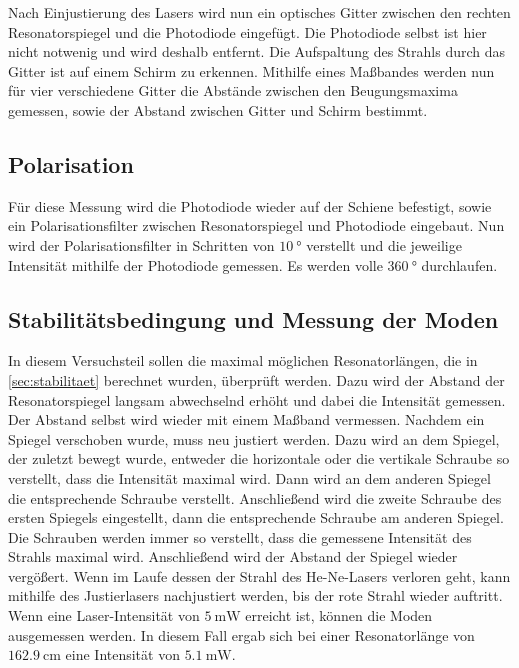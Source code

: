     Nach Einjustierung des Lasers wird nun ein optisches Gitter zwischen den rechten Resonatorspiegel und die Photodiode eingefügt.
    Die Photodiode selbst ist hier nicht notwenig und wird deshalb entfernt.
    Die Aufspaltung des Strahls durch das Gitter ist auf einem Schirm zu erkennen.
    Mithilfe eines Maßbandes werden nun für vier verschiedene Gitter die Abstände zwischen den Beugungsmaxima gemessen,
    sowie der Abstand zwischen Gitter und Schirm bestimmt.

\subsection{Polarisation}

    Für diese Messung wird die Photodiode wieder auf der Schiene befestigt,
    sowie ein Polarisationsfilter zwischen Resonatorspiegel und Photodiode eingebaut.
    Nun wird der Polarisationsfilter in Schritten von $\SI{10}{\degree}$ verstellt und die jeweilige Intensität mithilfe der Photodiode gemessen.
    Es werden volle $\SI{360}{\degree}$ durchlaufen.

\subsection{Stabilitätsbedingung und Messung der Moden}

    In diesem Versuchsteil sollen die maximal möglichen Resonatorlängen,
    die in \autoref{sec:stabilitaet} berechnet wurden,
    überprüft werden.
    Dazu wird der Abstand der Resonatorspiegel langsam abwechselnd erhöht und dabei die Intensität gemessen.
    Der Abstand selbst wird wieder mit einem Maßband vermessen.
    Nachdem ein Spiegel verschoben wurde,
    muss neu justiert werden.
    Dazu wird an dem Spiegel,
    der zuletzt bewegt wurde,
    entweder die horizontale oder die vertikale Schraube so verstellt,
    dass die Intensität maximal wird.
    Dann wird an dem anderen Spiegel die entsprechende Schraube verstellt.
    Anschließend wird die zweite Schraube des ersten Spiegels eingestellt,
    dann die entsprechende Schraube am anderen Spiegel.
    Die Schrauben werden immer so verstellt,
    dass die gemessene Intensität des Strahls maximal wird.
    Anschließend wird der Abstand der Spiegel wieder vergößert.
    Wenn im Laufe dessen der Strahl des He-Ne-Lasers verloren geht,
    kann mithilfe des Justierlasers nachjustiert werden,
    bis der rote Strahl wieder auftritt.\\
    Wenn eine Laser-Intensität von $\SI{5}{\milli\watt}$ erreicht ist,
    können die Moden ausgemessen werden.
    In diesem Fall ergab sich bei einer Resonatorlänge von $\SI{162.9}{\centi\meter}$ eine Intensität von $\SI{5.1}{\milli\watt}$.

